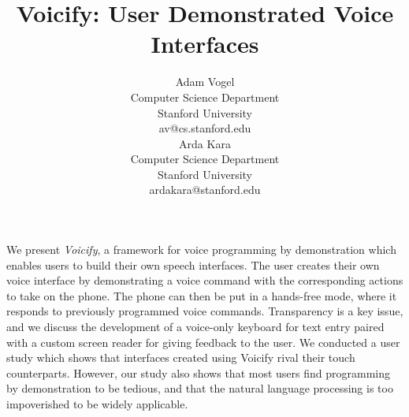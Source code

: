 \documentclass[letterpaper]{article}
\begin{document}




\title{Voicify: User Demonstrated Voice Interfaces}



\author{
\parbox[t]{9cm}{\centering
	     { Adam Vogel}\\
     Computer Science Department\\
             Stanford University \\
	     av@cs.stanford.edu}
\parbox[t]{9cm}{\centering
	     { Arda Kara}\\
	     Computer Science Department\\
       Stanford University\\
	     ardakara@stanford.edu}
}

\maketitle

\abstract
We present \emph{Voicify}, a framework for voice programming by 
demonstration which enables users to build their own speech interfaces.
The user creates their own voice interface by demonstrating a voice command with the corresponding
actions to take on the phone. The phone can then be put in a hands-free mode, where it
responds to previously programmed voice commands. 
Transparency is a key issue, and we discuss the development of a voice-only keyboard for
text entry paired with a custom screen reader for giving feedback to the user.
We conducted a user study which shows that
interfaces created using Voicify rival their touch counterparts.
However, our study also shows that most users find programming by demonstration to be
tedious, and that the natural language processing is too impoverished to be widely applicable.
\end{document}
